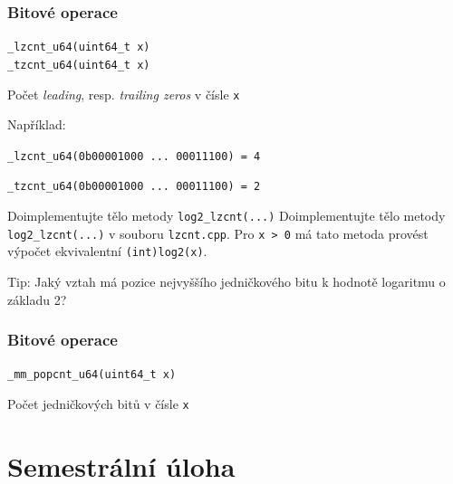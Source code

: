 \documentclass[usenames,dvipsnames,9pt]{beamer}
\begin{document}
\begin{frame}
  \frametitle{Bitové operace}

  \texttt{_lzcnt_u64(uint64_t x)} \\
  \texttt{_tzcnt_u64(uint64_t x)}

  \vspace{-0.35em}\hspace{10pt} Počet \emph{leading}, resp. \emph{trailing zeros} v čísle \texttt{x}

  \vspace{1em}

  Například:

  \hspace{10pt} \texttt{_lzcnt_u64(0b00001000 ... 00011100) = 4}

  \hspace{10pt} \texttt{_tzcnt_u64(0b00001000 ... 00011100) = 2}

  \vspace{1em}
  \pause

  \begin{block}{Doimplementujte tělo metody \texttt{log2\_lzcnt(...)}}
    Doimplementujte tělo metody \texttt{log2\_lzcnt(...)} v souboru \texttt{lzcnt.cpp}.
    Pro \texttt{x > 0} má tato metoda provést výpočet ekvivalentní \texttt{(int)log2(x)}.

    Tip: Jaký vztah má pozice nejvyššího jedničkového bitu k hodnotě logaritmu o základu 2?
  \end{block}
\end{frame}

\begin{frame}
  \frametitle{Bitové operace}

  \texttt{_mm_popcnt_u64(uint64_t x)}

  \vspace{-0.35em}\hspace{10pt} Počet jedničkových bitů v čísle \texttt{x}
\end{frame}

 \section{Semestrální úloha}
\end{document}
